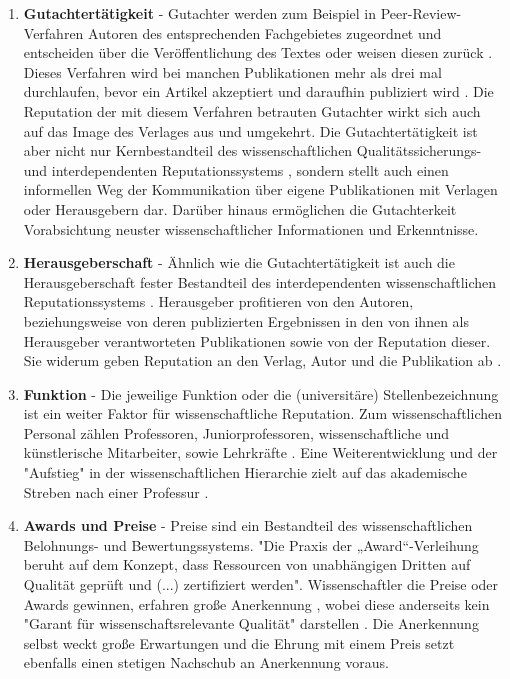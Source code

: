 \begin{enumerate}
\item \textbf{Gutachtertätigkeit} - Gutachter werden zum Beispiel in Peer-Review-Verfahren Autoren des entsprechenden Fachgebietes zugeordnet und entscheiden über die Veröffentlichung des Textes oder weisen diesen zurück \cite{Frey_2005}. Dieses Verfahren wird bei manchen Publikationen mehr als drei mal durchlaufen, bevor ein Artikel akzeptiert und daraufhin publiziert wird \cite{Frey_2005}. Die Reputation der mit diesem Verfahren betrauten Gutachter wirkt sich auch auf das Image des Verlages aus und umgekehrt. Die Gutachtertätigkeit ist aber nicht nur Kernbestandteil des wissenschaftlichen Qualitätssicherungs- und interdependenten Reputationssystems \cite{Frey_2005} \cite{mueller_2009_peerreview}, sondern stellt auch einen informellen Weg der Kommunikation über eigene Publikationen mit Verlagen oder Herausgebern dar. Darüber hinaus ermöglichen die Gutachterkeit Vorabsichtung neuster wissenschaftlicher Informationen und Erkenntnisse.
\item \textbf{Herausgeberschaft} - Ähnlich wie die Gutachtertätigkeit ist auch die Herausgeberschaft fester Bestandteil des interdependenten wissenschaftlichen Reputationssystems \cite{Frey_2005}. Herausgeber profitieren von den Autoren, beziehungsweise von deren publizierten Ergebnissen in den von ihnen als Herausgeber verantworteten Publikationen sowie von der Reputation dieser. Sie widerum geben Reputation an den Verlag, Autor und die Publikation ab \cite{suchen}.
\item \textbf{Funktion} - Die jeweilige Funktion oder die (universitäre) Stellenbezeichnung ist ein weiter Faktor für wissenschaftliche Reputation. Zum wissenschaftlichen Personal zählen Professoren, Juniorprofessoren, wissenschaftliche und künstlerische Mitarbeiter, sowie Lehrkräfte \cite{erhardt_2011_hochschulen}. Eine Weiterentwicklung und der "Aufstieg" in der wissenschaftlichen Hierarchie zielt auf das akademische Streben nach einer Professur \cite{Klecha_2008}.
\item \textbf{Awards und Preise} - Preise sind ein Bestandteil des wissenschaftlichen Belohnungs- und Bewertungssystems. "Die Praxis der „Award“-Verleihung beruht auf dem Konzept, dass Ressourcen von unabhängigen Dritten auf Qualität geprüft und (...) zertifiziert werden". Wissenschaftler die Preise oder Awards gewinnen, erfahren große Anerkennung \cite{suchen}, wobei diese anderseits kein "Garant für wissenschaftsrelevante Qualität" darstellen \cite{bargheer_2002_qualitatskriterien}. Die Anerkennung selbst weckt große Erwartungen und die Ehrung mit einem Preis setzt ebenfalls einen stetigen Nachschub an Anerkennung voraus\cite{suchen}. 
\end{enumerate}

